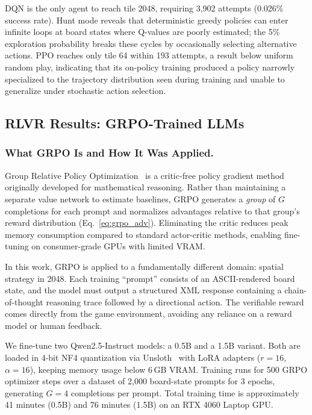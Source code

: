 \documentclass[letterpaper]{article}
\begin{document}
DQN is the only agent to reach tile 2048, requiring 3,902 attempts (0.026\% success rate). Hunt mode reveals that deterministic greedy policies can enter infinite loops at board states where Q-values are poorly estimated; the 5\% exploration probability breaks these cycles by occasionally selecting alternative actions. PPO reaches only tile 64 within 193 attempts, a result below uniform random play, indicating that its on-policy training produced a policy narrowly specialized to the trajectory distribution seen during training and unable to generalize under stochastic action selection.

\subsection{RLVR Results: GRPO-Trained LLMs}

\subsubsection{What GRPO Is and How It Was Applied.}

Group Relative Policy Optimization~\cite{shao2024deepseekmath} is a critic-free policy gradient method originally developed for mathematical reasoning. Rather than maintaining a separate value network to estimate baselines, GRPO generates a \emph{group} of $G$ completions for each prompt and normalizes advantages relative to that group's reward distribution (Eq.~\ref{eq:grpo_adv}). Eliminating the critic reduces peak memory consumption compared to standard actor-critic methods, enabling fine-tuning on consumer-grade GPUs with limited VRAM.

In this work, GRPO is applied to a fundamentally different domain: spatial strategy in 2048. Each training ``prompt'' consists of an ASCII-rendered board state, and the model must output a structured XML response containing a chain-of-thought reasoning trace followed by a directional action. The verifiable reward comes directly from the game environment, avoiding any reliance on a reward model or human feedback.

We fine-tune two Qwen2.5-Instruct models: a 0.5B and a 1.5B variant. Both are loaded in 4-bit NF4 quantization via Unsloth~\cite{unsloth2024} with LoRA adapters ($r{=}16$, $\alpha{=}16$), keeping memory usage below 6\,GB VRAM. Training runs for 500 GRPO optimizer steps over a dataset of 2,000 board-state prompts for 3 epochs, generating $G{=}4$ completions per prompt. Total training time is approximately 41 minutes (0.5B) and 76 minutes (1.5B) on an RTX 4060 Laptop GPU.
\end{document}

